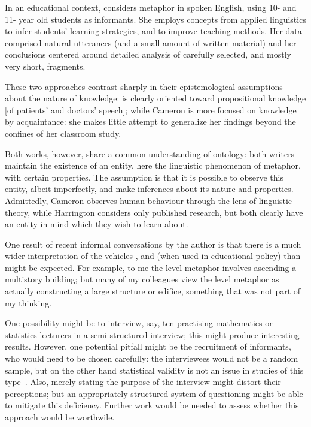In an educational context,  considers metaphor in
spoken English, using 10- and 11- year old students as informants.
She employs concepts from applied linguistics to infer students'
learning strategies, and to improve teaching methods.  Her data
comprised natural utterances (and a small amount of written material)
and her conclusions centered around detailed analysis of carefully
selected, and mostly very short, fragments.

These two approaches contrast sharply in their epistemological
assumptions about the nature of knowledge: \citeauthor{harrington2012}
is clearly oriented toward propositional knowledge [of patients' and
  doctors' speech]; while Cameron is more focused on knowledge by
acquaintance: she makes little attempt to generalize her findings
beyond the confines of her classroom study.

Both works, however, share a common understanding of ontology: both
writers maintain the existence of an entity, here the linguistic
phenomenon of metaphor, with certain properties.  The assumption is
that it is possible to observe this entity, albeit imperfectly, and
make inferences about its nature and properties.  Admittedly, Cameron
observes human behaviour through the lens of linguistic theory, while
Harrington considers only published research, but both clearly have an
entity in mind which they wish to learn about.

One result of recent informal conversations by the author is that
there is a much wider interpretation of the vehicles ,
 and  (when used in educational
policy) than might be expected.  For example, to me the level metaphor
involves ascending a multistory building; but many of my colleagues
view the level metaphor as actually constructing a large structure or
edifice, something that was not part of my thinking.

One possibility might be to interview, say, ten practising mathematics
or statistics lecturers in a semi-structured interview; this might
produce interesting results.  However, one potential pitfall might be
the recruitment of informants, who would need to be chosen carefully:
the interviewees would not be a random sample, but on the other hand
statistical validity is not an issue in studies of this
type~\citep{ribbins2012}.  Also, merely stating the purpose of the
interview might distort their perceptions; but an appropriately
structured system of questioning might be able to mitigate this
deficiency.  Further work would be needed to assess whether this approach would be worthwile.


